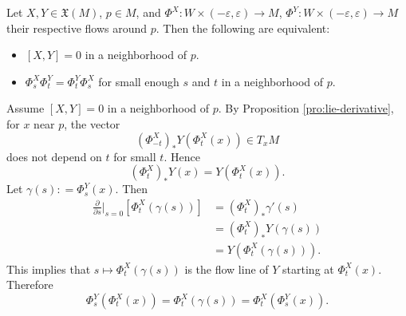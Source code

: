 \documentclass{ximera}
\begin{document}
    \begin{proposition}
        Let $X,Y \in \mathfrak{X}(M)$, $p \in M$, and $\Phi ^X : W \times (-\varepsilon , \varepsilon ) \to M$, $\Phi ^Y : W \times (- \varepsilon , \varepsilon ) \to M$ their respective flows around $p$. Then the following are equivalent:
        \begin{itemize}
            \item $[X,Y] = 0$ in a neighborhood of $p$.
            \item $\Phi_s^X \Phi_t^Y = \Phi_t^Y \Phi_s^X $ for small enough $s$ and $t$ in a neighborhood of $p$. 
        \end{itemize}   

    \begin{solution}
        Assume $[X,Y] = 0$ in a neighborhood of $p$. By Proposition \ref{pro:lie-derivative}, for $x$ near $p$, the vector  
        \[    ( \Phi ^X _{-t} )_{\ast} Y (\Phi _t^X (x))   \in T_xM  \]
        does not depend on $t$ for small $t$. Hence
        \[        (  \Phi ^X _{t} )_{\ast} Y(x)  = Y ( \Phi ^X_t (x) )  .   \]
        Let $\gamma (s) : = \Phi ^Y_s (x)$. Then 
        \begin{align*}
            \frac{\partial }{\partial s} \Big \vert _{s = 0 } \left[ \Phi ^X_t ( \gamma (s)  )   \right] & = (\Phi ^X_t)_{\ast} \gamma ' (s) \\
            & = (\Phi ^X_t)_{\ast}  Y (\gamma (s) ) \\
            & = Y ( \Phi ^X_t (\gamma (s))) .
        \end{align*}
        This implies that $s \mapsto \Phi^X_t (\gamma (s) )$ is the flow line of $Y$ starting at $\Phi^X_t (x)$. Therefore
   \[            \Phi ^Y_s (  \Phi_t ^X (x)  )  = \Phi^X_t ( \gamma (s) )        = \Phi^X_t ( \Phi _s ^Y  (x) ). \]
        

\end{solution}
\end{proposition}
\end{document}
